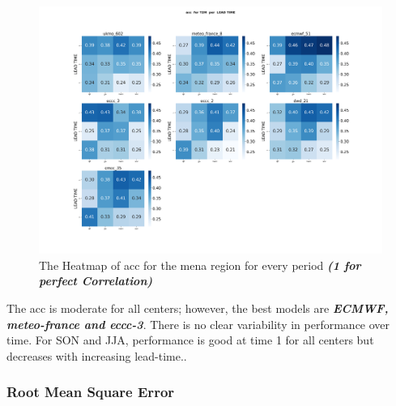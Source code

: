 \begin{figure}[H]
	\centering
	\includegraphics[scale=0.25]{plots/det/acc/acc_T2M_mena.png}
	\caption{The Heatmap of acc for the mena region for every period \textbf{\textit{(1 for perfect Correlation)} }}
\end{figure}
The acc is moderate for all centers; however, the best models are \textbf{\textit{ECMWF, meteo-france and eccc-3}}. There is no clear variability in performance over time. For SON and JJA, performance is good at time 1 for all centers but decreases with increasing lead-time..



\subsubsection{Root Mean Square Error}


